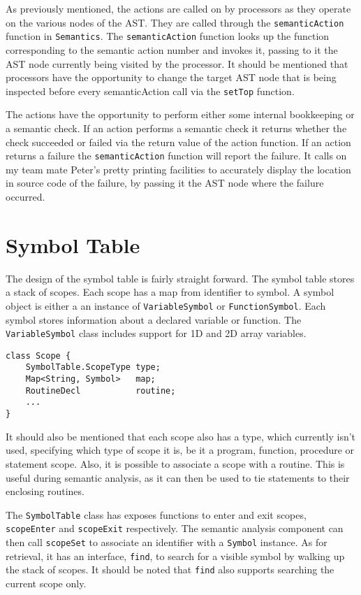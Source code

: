 \documentclass[oneside]{amsart}
\theoremstyle{definition}
\theoremstyle{remark}
\numberwithin{equation}{section}
\begin{document}
As previously mentioned, the actions are called on by processors as they operate
on the various nodes of the AST. They are called through the
\texttt{semanticAction} function in \texttt{Semantics}. The
\texttt{semanticAction} function looks up the function corresponding to the
semantic action number and invokes it, passing to it the AST node currently
being visited by the processor. It should be mentioned that processors have the
opportunity to change the target AST node that is being inspected before every
semanticAction call via the \texttt{setTop} function.

The actions have the opportunity to perform either some internal bookkeeping or
a semantic check. If an action performs a semantic check it returns whether the
check succeeded or failed via the return value of the action function. If an
action returns a failure the \texttt{semanticAction} function will report the
failure. It calls on my team mate Peter's pretty printing facilities to
accurately display the location in source code of the failure, by passing it the
AST node where the failure occurred.

\section{Symbol Table}
The design of the symbol table is fairly straight forward. The symbol table
stores a stack of scopes. Each scope has a map from identifier to symbol. A
symbol object is either a an instance of \texttt{VariableSymbol} or
\texttt{FunctionSymbol}. Each symbol stores information about a declared
variable or function. The \texttt{VariableSymbol} class includes support for
1D and 2D array variables.

\begin{lstlisting}
class Scope {
    SymbolTable.ScopeType type;
    Map<String, Symbol>   map;
    RoutineDecl           routine;
    ...
}
\end{lstlisting}

It should also be mentioned that each scope also has a type, which currently
isn't used, specifying which type of scope it is, be it a program, function,
procedure or statement scope. Also, it is possible to associate a scope with
a routine. This is useful during semantic analysis, as it can then be used to
tie statements to their enclosing routines.

The \texttt{SymbolTable} class has exposes functions to enter and exit scopes,
\texttt{scopeEnter} and \texttt{scopeExit} respectively. The semantic analysis
component can then call \texttt{scopeSet} to associate an identifier with a
\texttt{Symbol} instance. As for retrieval, it has an interface, \texttt{find},
to search for a visible symbol by walking up the stack of scopes. It should
be noted that \texttt{find} also supports searching the current scope only.

\end{document}
